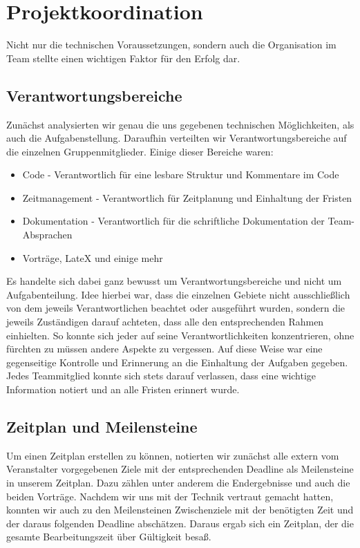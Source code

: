 \section{Projektkoordination}
\label{sec:projektkoordination}

Nicht nur die technischen Voraussetzungen, sondern auch die Organisation im Team stellte einen wichtigen Faktor für den Erfolg dar.

\subsection{Verantwortungsbereiche}
Zunächst analysierten wir genau die uns gegebenen technischen Möglichkeiten, als auch die Aufgabenstellung. Daraufhin verteilten wir Verantwortungsbereiche auf die einzelnen Gruppenmitglieder. Einige dieser Bereiche waren:
\begin{itemize}
	\item Code - Verantwortlich für eine lesbare Struktur und Kommentare im Code
	\item Zeitmanagement - Verantwortlich für Zeitplanung und Einhaltung der Fristen
	\item Dokumentation - Verantwortlich für die schriftliche Dokumentation der Team-Absprachen
	\item Vorträge, LateX und einige mehr
\end{itemize}
Es handelte sich dabei ganz bewusst um Verantwortungsbereiche und nicht um Aufgabenteilung. Idee hierbei war, dass die einzelnen Gebiete nicht ausschließlich von dem jeweils Verantwortlichen beachtet oder ausgeführt wurden, sondern die jeweils Zuständigen darauf achteten, dass alle den entsprechenden Rahmen einhielten. So konnte sich jeder auf seine Verantwortlichkeiten konzentrieren, ohne fürchten zu müssen andere Aspekte zu vergessen. Auf diese Weise war eine gegenseitige Kontrolle und Erinnerung an die Einhaltung der Aufgaben gegeben. Jedes Teammitglied konnte sich stets darauf verlassen, dass eine wichtige Information notiert und an alle Fristen erinnert wurde.


\subsection{Zeitplan und Meilensteine}
Um einen Zeitplan erstellen zu können, notierten wir zunächst alle extern vom Veranstalter vorgegebenen Ziele mit der entsprechenden Deadline als Meilensteine in unserem Zeitplan. Dazu zählen unter anderem die Endergebnisse und auch die beiden Vorträge. Nachdem wir uns mit der Technik vertraut gemacht hatten, konnten wir auch zu den Meilensteinen Zwischenziele mit der benötigten Zeit und der daraus folgenden Deadline abschätzen. Daraus ergab sich ein Zeitplan, der die gesamte Bearbeitungszeit über Gültigkeit besaß.

